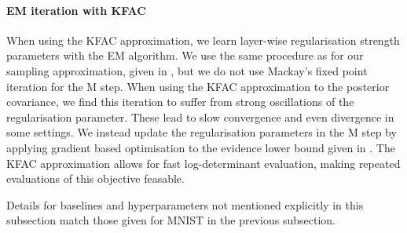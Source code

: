 \paragraph{EM iteration with KFAC} When using the KFAC approximation, we learn layer-wise regularisation strength parameters with the EM algorithm. We use the same procedure as for our sampling approximation, given in , but we do not use Mackay's fixed point iteration for the M step. When using the KFAC approximation to the posterior covariance, we find this iteration to suffer from strong oscillations of the regularisation parameter. These lead to slow convergence and even divergence in some settings.
We instead update the regularisation parameters in the M step by applying gradient based optimisation to the evidence lower bound given in . The KFAC approximation allows for fast log-determinant evaluation, making repeated evaluations of this objective feasable. 

Details for baselines and hyperparameters not mentioned explicitly in this subsection match those given for MNIST in the previous subsection. 

